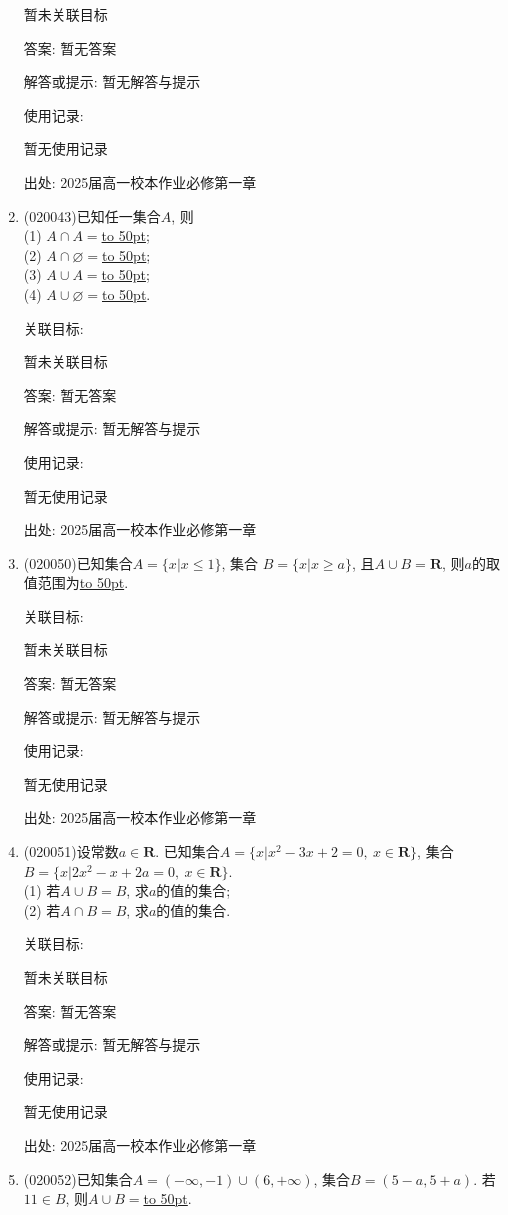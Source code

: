 \documentclass[10pt,a4paper]{article}
\newcommand{\blank}[1]{\underline{\hbox to #1pt{}}}
\begin{document}
\begin{enumerate}[1.]
暂未关联目标

答案: 暂无答案

解答或提示: 暂无解答与提示

使用记录:

暂无使用记录


出处: 2025届高一校本作业必修第一章
\item { (020043)}已知任一集合$A$, 则\\
(1) $A\cap A=$\blank{50};\\
(2) $A\cap\varnothing=$\blank{50};\\
(3) $A\cup A=$\blank{50};\\
(4) $A\cup\varnothing=$\blank{50}.


关联目标:

暂未关联目标

答案: 暂无答案

解答或提示: 暂无解答与提示

使用记录:

暂无使用记录


出处: 2025届高一校本作业必修第一章
\item { (020050)}已知集合$A=\{x| x\le 1\}$, 集合 $B=\{x| x\ge a\}$, 且$A\cup B=\mathbf{R}$, 则$a$的取值范围为\blank{50}.


关联目标:

暂未关联目标

答案: 暂无答案

解答或提示: 暂无解答与提示

使用记录:

暂无使用记录


出处: 2025届高一校本作业必修第一章
\item { (020051)}设常数$a\in \mathbf{R}$. 已知集合$A=\{x|x^2-3x+2=0, \ x\in\mathbf{R}\}$, 集合$B=\{x|2x^2-x+2a=0,\  x\in\mathbf{R}\}$.\\ (1) 若$A\cup B=B$, 求$a$的值的集合;\\
(2) 若$A\cap B=B$, 求$a$的值的集合.


关联目标:

暂未关联目标

答案: 暂无答案

解答或提示: 暂无解答与提示

使用记录:

暂无使用记录


出处: 2025届高一校本作业必修第一章
\item { (020052)}已知集合$A=(-\infty, -1)\cup(6, +\infty)$, 集合$B=(5-a, 5+a)$. 若$11\in B$, 则$A\cup B=$\blank{50}.



\end{enumerate}
\end{document}
